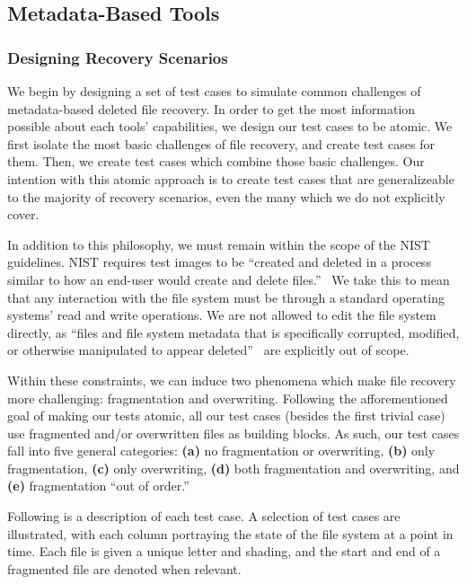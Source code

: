 \subsection{Metadata-Based Tools}
\subsubsection{Designing Recovery Scenarios}

We begin by designing a set of test cases to simulate common challenges of metadata-based deleted file recovery.
In order to get the most information possible about each tools' capabilities, we design our test cases to be atomic.
We first isolate the most basic challenges of file recovery, and create test cases for them.
Then, we create test cases which combine those basic challenges.
Our intention with this atomic approach is to create test cases that are generalizeable to the majority of recovery scenarios, even the many which we do not explicitly cover.

In addition to this philosophy, we must remain within the scope of the NIST guidelines.
NIST requires test images to be ``created and deleted in a process similar to how an end-user would create and delete files.''~\cite{meta:dfr:standards}
We take this to mean that any interaction with the file system must be through a standard operating systems'  read and write operations.
We are not allowed to edit the file system directly, as ``files and file system metadata that is specifically corrupted, modified, or otherwise manipulated to appear deleted''~\cite{meta:dfr:standards} are explicitly out of scope.

Within these constraints, we can induce two phenomena which make file recovery more challenging: fragmentation and overwriting.
Following the afforementioned goal of making our tests atomic, all our test cases (besides the first trivial case) use fragmented and/or overwritten files as building blocks.
As such, our test cases fall into five general categories:
{\bf(a)} no fragmentation or overwriting, 
{\bf (b)} only fragmentation,
{\bf (c)} only overwriting,
{\bf (d)} both fragmentation and overwriting,
and {\bf (e)} fragmentation ``out of order.''


Following is a description of each test case. A selection of test cases are illustrated, with each column portraying the state of the file system at a point in time. Each file is given a unique letter and shading, and the start and end of a fragmented file are denoted when relevant.

